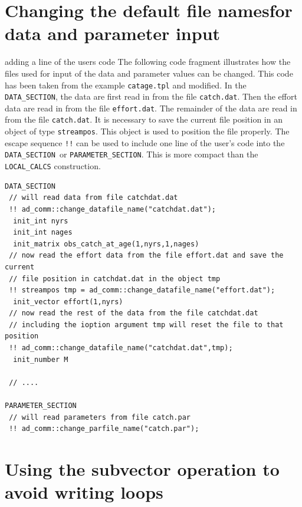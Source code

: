 \documentclass{admbmanual}
\newcommand\DS{\texttt{DATA\_SECTION}}
\newcommand\PS{\texttt{PARAMETER\_SECTION}}
\begin{document}
\section{Changing the default file names\br for data and parameter input}

 {adding a line of the users code}
The following code fragment illustrates how the files used for input of the data
and parameter values can be changed. This code has been taken from the example
\texttt{catage.tpl} and modified. In the \DS, the data are first read in from
the file \texttt{catch.dat}. Then the effort data are read in from the file
\texttt{effort.dat}. The remainder of the data are read in from the file
\texttt{catch.dat}. It is necessary to save the current file position in an
object of type \texttt{streampos}. This object is used to position the file
properly. The escape sequence {\tt!!} can be used to include one line of the
user's code into the \DS\ or \PS. This is more compact than the
\texttt{LOCAL\_CALCS} construction.
\begin{lstlisting}
DATA_SECTION
 // will read data from file catchdat.dat
 !! ad_comm::change_datafile_name("catchdat.dat");
  init_int nyrs
  init_int nages
  init_matrix obs_catch_at_age(1,nyrs,1,nages)
 // now read the effort data from the file effort.dat and save the current
 // file position in catchdat.dat in the object tmp
 !! streampos tmp = ad_comm::change_datafile_name("effort.dat");
  init_vector effort(1,nyrs)
 // now read the rest of the data from the file catchdat.dat
 // including the ioption argument tmp will reset the file to that position
 !! ad_comm::change_datafile_name("catchdat.dat",tmp);
  init_number M

 // ....

PARAMETER_SECTION
 // will read parameters from file catch.par
 !! ad_comm::change_parfile_name("catch.par");
\end{lstlisting}

\section{Using the subvector operation to avoid writing loops}
\end{document}

